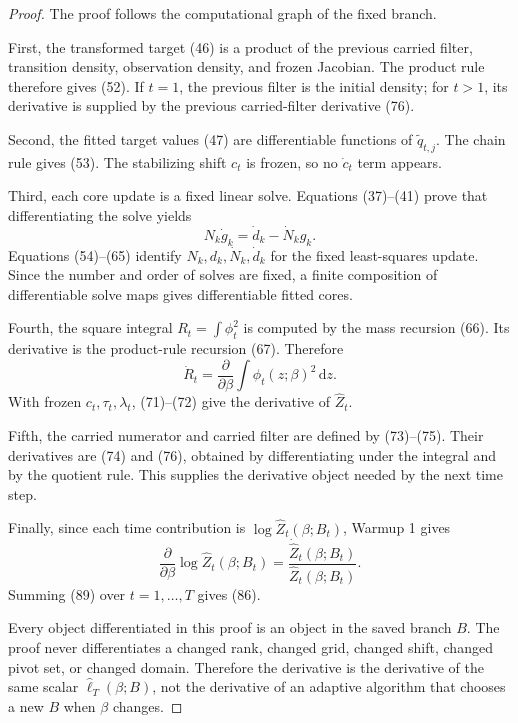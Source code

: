 \documentclass[11pt]{article}
\newcommand{\dd}{\,\mathrm d}
\newcommand{\widehatell}{\widehat\ell}
\begin{document}
\begin{proof}
The proof follows the computational graph of the fixed branch.

First, the transformed target (46) is a product of the previous carried filter,
transition density, observation density, and frozen Jacobian.  The product rule
therefore gives (52).  If \(t=1\), the previous filter is the initial density;
for \(t>1\), its derivative is supplied by the previous carried-filter
derivative (76).

Second, the fitted target values (47) are differentiable functions of
\(\widetilde q_{t,j}\).  The chain rule gives (53).  The stabilizing shift
\(c_t\) is frozen, so no \(\dot c_t\) term appears.

Third, each core update is a fixed linear solve.  Equations (37)--(41) prove
that differentiating the solve yields
\[
    N_k\dot g_k=\dot d_k-\dot N_k g_k.
    \tag{P19-87}
\]
Equations (54)--(65) identify \(N_k,d_k,\dot N_k,\dot d_k\) for the fixed
least-squares update.  Since the number and order of solves are fixed, a finite
composition of differentiable solve maps gives differentiable fitted cores.

Fourth, the square integral \(R_t=\int\phi_t^2\) is computed by the mass
recursion (66).  Its derivative is the product-rule recursion (67).  Therefore
\[
    \dot R_t=\frac{\partial}{\partial\beta}
    \int\phi_t(z;\beta)^2\dd z.
    \tag{P19-88}
\]
With frozen \(c_t,\tau_t,\lambda_t\), (71)--(72) give the derivative of
\(\widehat Z_t\).

Fifth, the carried numerator and carried filter are defined by (73)--(75).
Their derivatives are (74) and (76), obtained by differentiating under the
integral and by the quotient rule.  This supplies the derivative object needed
by the next time step.

Finally, since each time contribution is \(\log\widehat Z_t(\beta;B_t)\),
Warmup 1 gives
\[
    \frac{\partial}{\partial\beta}
    \log\widehat Z_t(\beta;B_t)
    =
    \frac{\dot{\widehat Z}_t(\beta;B_t)}
    {\widehat Z_t(\beta;B_t)}.
    \tag{P19-89}
\]
Summing (89) over \(t=1,\ldots,T\) gives (86).

Every object differentiated in this proof is an object in the saved branch
\(B\).  The proof never differentiates a changed rank, changed grid, changed
shift, changed pivot set, or changed domain.  Therefore the derivative is the
derivative of the same scalar \(\widehatell_T(\beta;B)\), not the derivative of
an adaptive algorithm that chooses a new \(B\) when \(\beta\) changes.
\end{proof}
\end{document}
